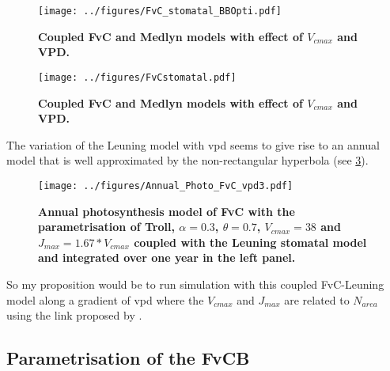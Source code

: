 \documentclass[a4paper,11pt]{article}
\begin{document}
\begin{figure}[ht]
\centering
\texttt{[image: ../figures/FvC\_stomatal\_BBOpti.pdf]}
\caption{\textbf{Coupled FvC and Medlyn models with effect of $V_{cmax}$ and VPD.}
\label{fig:photo_stomat_opti}}
\end{figure}

\begin{figure}[ht]
\centering
\texttt{[image: ../figures/FvCstomatal.pdf]}
\caption{\textbf{Coupled FvC and Medlyn models with effect of $V_{cmax}$ and VPD.}
\label{fig:photo_stomat}}
\end{figure}

\clearpage

The variation of the Leuning model with vpd seems to give rise to an annual model that is well approximated by the non-rectangular hyperbola (see \ref{fig:photo_annu_fvc_vpd3}).

\begin{figure}[ht]
\centering
\texttt{[image: ../figures/Annual\_Photo\_FvC\_vpd3.pdf]}
\caption{\textbf{Annual photosynthesis model of FvC with the parametrisation of Troll, $\alpha = 0.3$, $\theta = 0.7$, $V_{cmax} = 38$ and $J_{max} = 1.67 * V_{cmax}$ coupled with the Leuning stomatal model and integrated over one year in the left panel.}
\label{fig:photo_annu_fvc_vpd3}}
\end{figure}

So my proposition would be to run simulation with this coupled FvC-Leuning model along a gradient of vpd where the $V_{cmax}$ and $J_{max}$ are related to $N_{area}$ using the link proposed by \citep{Sakschewski-2015}.

\subsection{Parametrisation of the FvCB}
\end{document}
